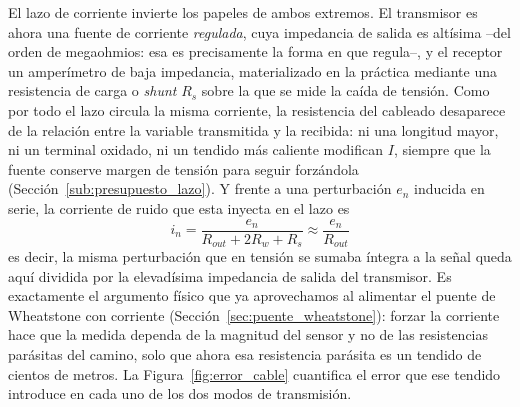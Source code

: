 El lazo de corriente invierte los papeles de ambos extremos. El transmisor es ahora una fuente de corriente \emph{regulada}, cuya impedancia de salida es altísima --del orden de megaohmios: esa es precisamente la forma en que regula--, y el receptor un amperímetro de baja impedancia, materializado en la práctica mediante una resistencia de carga o \emph{shunt} $R_s$ sobre la que se mide la caída de tensión. Como por todo el lazo circula la misma corriente, la resistencia del cableado desaparece de la relación entre la variable transmitida y la recibida: ni una longitud mayor, ni un terminal oxidado, ni un tendido más caliente modifican $I$, siempre que la fuente conserve margen de tensión para seguir forzándola (Sección~\ref{sub:presupuesto_lazo}). Y frente a una perturbación $e_n$ inducida en serie, la corriente de ruido que esta inyecta en el lazo es
\begin{equation}\label{eq:ruido_serie_lazo}
    i_n = \frac{e_n}{R_{out} + 2R_w + R_s} \approx \frac{e_n}{R_{out}}
\end{equation}
es decir, la misma perturbación que en tensión se sumaba íntegra a la señal queda aquí dividida por la elevadísima impedancia de salida del transmisor. Es exactamente el argumento físico que ya aprovechamos al alimentar el puente de Wheatstone con corriente (Sección~\ref{sec:puente_wheatstone}): forzar la corriente hace que la medida dependa de la magnitud del sensor y no de las resistencias parásitas del camino, solo que ahora esa resistencia parásita es un tendido de cientos de metros. La Figura~\ref{fig:error_cable} cuantifica el error que ese tendido introduce en cada uno de los dos modos de transmisión.

